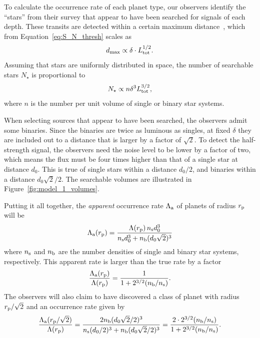 \documentclass[12pt,modern]{aastex61}
\renewcommand{\a}{_{\rm a}}
\newcommand{\s}{_{\rm s}}
\newcommand{\p}{_{\rm p}}
\renewcommand{\b}{_{\rm b}}
\begin{document}
To calculate the occurrence rate of each planet type, our observers
identify the ``stars'' from their survey that appear to have been
searched for signals of each depth.  These transits are detected
within a certain maximum
distance~\citep[see][]{pepper_using_2003,pepper_searching_2005}, which
from Equation~\ref{eq:S_N_thresh} scales as
\begin{equation}
  d_{\rm max} \propto \delta \cdot L_{\rm tot}^{1/2}.
  \label{eq:dmax}
\end{equation}
Assuming that stars are uniformly distributed in space, the number of
searchable stars $N_\star$ is proportional to
\begin{equation}
    N_\star \propto n \delta^3 L_{\rm tot}^{3/2},
\label{eq:N_searchable_prop}
\end{equation}
where $n$ is the number per unit volume of single or binary star
systems. 

When selecting sources that appear to have been searched, the
observers admit some binaries.  Since the binaries are twice as
luminous as singles, at fixed $\delta$ they are included out to a
distance that is larger by a factor of $\sqrt{2}$.  To detect the
half-strength signal, the observers need the noise level to be lower
by a factor of two, which means the flux must be four times higher
than that of a single star at distance $d_0$.  This is true of single
stars within a distance $d_0/2$, and binaries within a distance
$d_0\sqrt{2}/2$.  The searchable volumes are illustrated in
Figure~\ref{fig:model_1_volumes}.

Putting it all together, the {\it apparent} occurrence rate
$\Lambda\a$ of planets of radius $r\p$ will be
\begin{equation}
    \Lambda\a(r\p) = 
        \frac{\Lambda(r\p) \, n\s d_0^3}
        {n\s d_0^3 + n\b (d_0\sqrt{2})^3}
    \label{eq:rate_at_rp}
\end{equation}
where $n\s$ and $n\b$ are the number densities of single and binary
star systems, respectively.  This apparent rate is larger than the
true rate by a factor
\begin{equation}
    \frac{\Lambda\a(r\p)}{\Lambda(r\p)} = 
        \frac{1}{1 + 2^{3/2}(n\b/n\s)}.
    \label{eq:correction_rp}
\end{equation}
The observers will also claim to have discovered a class of planet
with radius $r\p/\sqrt{2}$ and an occurrence rate given by
\begin{equation}
    \frac{\Lambda\a(r\p/\sqrt{2})}{\Lambda(r\p)}
    =
    \frac{2n\b (d_0\sqrt{2}/2)^3}
      {n\s (d_0/2)^3 + n\b (d_0\sqrt{2}/2)^3}
    =
    \frac{2\cdot2^{3/2}(n\b/n\s)}{1 + 2^{3/2}
    (n\b/n\s)}.
    \label{eq:correction_diluted_rp}
\end{equation}
\end{document}
